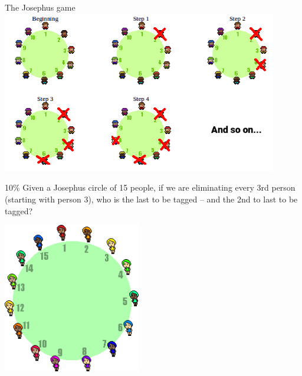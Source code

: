 \documentclass[a4paper,12pt]{book}
\begin{document}
\begin{intro}{The Josephus game}
            \includegraphics[width=12cm]{images/josephus.png}
        \end{intro}

        \newpage
        \begin{question}{4}{10\%}
            Given a Josephus circle of 15 people,
            if we are eliminating every 3rd person (starting with person 3),
            who is the last to be tagged – and the 2nd to last to be tagged?

            \begin{center}
                \includegraphics[width=6cm]{images/josephus-15.png}
            \end{center}
            
        \end{question}
\end{document}
